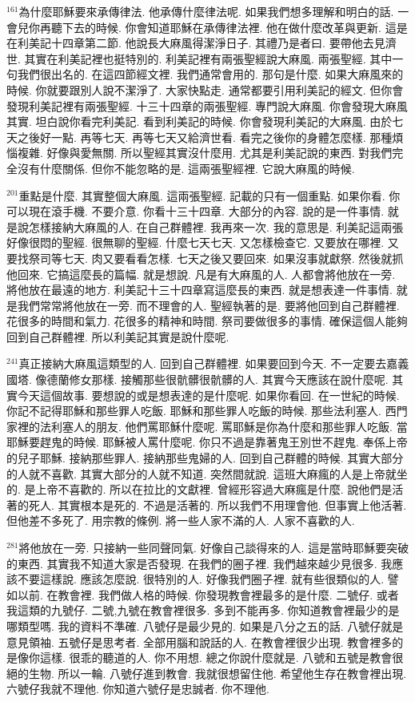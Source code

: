 \documentclass{book}
\begin{document}
$^{161}$為什麼耶穌要來承傳律法.
他承傳什麼律法呢.
如果我們想多理解和明白的話.
一會兒你再聽下去的時候.
你會知道耶穌在承傳律法裡.
他在做什麼改革與更新.
這是在利美記十四章第二節.
他說長大麻風得潔淨日子.
其禮乃是者曰.
要帶他去見濟世.
其實在利美記裡也挺特別的.
利美記裡有兩張聖經說大麻風.
兩張聖經.
其中一句我們很出名的.
在這四節經文裡.
我們通常會用的.
那句是什麼.
如果大麻風來的時候.
你就要跟別人說不潔淨了.
大家快點走.
通常都要引用利美記的經文.
但你會發現利美記裡有兩張聖經.
十三十四章的兩張聖經.
專門說大麻風.
你會發現大麻風其實.
坦白說你看完利美記.
看到利美記的時候.
你會發現利美記的大麻風.
由於七天之後好一點.
再等七天.
再等七天又給濟世看.
看完之後你的身體怎麼樣.
那種煩惱複雜.
好像與愛無關.
所以聖經其實沒什麼用.
尤其是利美記說的東西.
對我們完全沒有什麼關係.
但你不能忽略的是.
這兩張聖經裡.
它說大麻風的時候.

$^{201}$重點是什麼.
其實整個大麻風.
這兩張聖經.
記載的只有一個重點.
如果你看.
你可以現在滾手機.
不要介意.
你看十三十四章.
大部分的內容.
說的是一件事情.
就是說怎樣接納大麻風的人.
在自己群體裡.
我再來一次.
我的意思是.
利美記這兩張好像很悶的聖經.
很無聊的聖經.
什麼七天七天.
又怎樣檢查它.
又要放在哪裡.
又要找祭司等七天.
肉又要看看怎樣.
七天之後又要回來.
如果沒事就獻祭.
然後就抓他回來.
它搞這麼長的篇幅.
就是想說.
凡是有大麻風的人.
人都會將他放在一旁.
將他放在最遠的地方.
利美記十三十四章寫這麼長的東西.
就是想表達一件事情.
就是我們常常將他放在一旁.
而不理會的人.
聖經執著的是.
要將他回到自己群體裡.
花很多的時間和氣力.
花很多的精神和時間.
祭司要做很多的事情.
確保這個人能夠回到自己群體裡.
所以利美記其實是說什麼呢.

$^{241}$真正接納大麻風這類型的人.
回到自己群體裡.
如果要回到今天.
不一定要去嘉義國塔.
像德蘭修女那樣.
接觸那些很骯髒很骯髒的人.
其實今天應該在說什麼呢.
其實今天這個故事.
要想說的或是想表達的是什麼呢.
如果你看回.
在一世紀的時候.
你記不記得耶穌和那些罪人吃飯.
耶穌和那些罪人吃飯的時候.
那些法利塞人.
西門家裡的法利塞人的朋友.
他們罵耶穌什麼呢.
罵耶穌是你為什麼和那些罪人吃飯.
當耶穌要趕鬼的時候.
耶穌被人罵什麼呢.
你只不過是靠著鬼王別世不趕鬼.
奉係上帝的兒子耶穌.
接納那些罪人.
接納那些鬼婦的人.
回到自己群體的時候.
其實大部分的人就不喜歡.
其實大部分的人就不知道.
突然間就說.
這班大麻瘋的人是上帝就坐的.
是上帝不喜歡的.
所以在拉比的文獻裡.
曾經形容過大麻瘋是什麼.
說他們是活著的死人.
其實根本是死的.
不過是活著的.
所以我們不用理會他.
但事實上他活著.
但他差不多死了.
用宗教的條例.
將一些人家不滿的人.
人家不喜歡的人.

$^{281}$將他放在一旁.
只接納一些同聲同氣.
好像自己談得來的人.
這是當時耶穌要突破的東西.
其實我不知道大家是否發現.
在我們的圈子裡.
我們越來越少見很多.
我應該不要這樣說.
應該怎麼說.
很特別的人.
好像我們圈子裡.
就有些很類似的人.
譬如以前.
在教會裡.
我們做人格的時候.
你發現教會裡最多的是什麼.
二號仔.
或者我這類的九號仔.
二號,九號在教會裡很多.
多到不能再多.
你知道教會裡最少的是哪類型嗎.
我的資料不準確.
八號仔是最少見的.
如果是八分之五的話.
八號仔就是意見領袖.
五號仔是思考者.
全部用腦和說話的人.
在教會裡很少出現.
教會裡多的是像你這樣.
很乖的聽道的人.
你不用想.
總之你說什麼就是.
八號和五號是教會很絕的生物.
所以一輪.
八號仔進到教會.
我就很想留住他.
希望他生存在教會裡出現.
六號仔我就不理他.
你知道六號仔是忠誠者.
你不理他.
\end{document}
